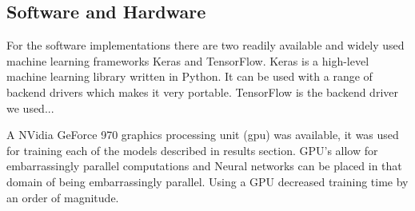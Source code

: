 \subsection{Software and Hardware}
For the software implementations there are two readily available and widely used machine learning frameworks Keras and TensorFlow. Keras is a high-level machine learning library written in Python. It can be used with a range of backend drivers which makes it very portable. TensorFlow is the backend driver we used...

A NVidia GeForce 970 graphics processing unit (gpu) was available, it was used for training each of the models described in results section. GPU's allow for embarrassingly parallel computations and Neural networks can be placed in that domain of being embarrassingly parallel. Using a GPU decreased training time by an order of magnitude.
